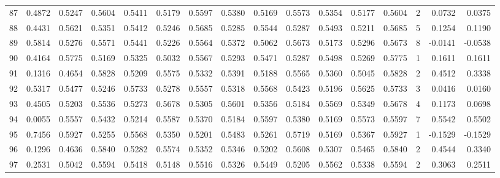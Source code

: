 \begin{tabular}{lrrrrrrrrrrrrrrr}
87  &      0.4872 &  0.5247 &  0.5604 &  0.5411 &  0.5179 &  0.5597 &  0.5380 &  0.5169 &  0.5573 &  0.5354 &   0.5177 &     0.5604 &      2 &                    0.0732 &                     0.0375 \\
88  &      0.4431 &  0.5621 &  0.5351 &  0.5412 &  0.5246 &  0.5685 &  0.5285 &  0.5544 &  0.5287 &  0.5493 &   0.5211 &     0.5685 &      5 &                    0.1254 &                     0.1190 \\
89  &      0.5814 &  0.5276 &  0.5571 &  0.5441 &  0.5226 &  0.5564 &  0.5372 &  0.5062 &  0.5673 &  0.5173 &   0.5296 &     0.5673 &      8 &                   -0.0141 &                    -0.0538 \\
90  &      0.4164 &  0.5775 &  0.5169 &  0.5325 &  0.5032 &  0.5567 &  0.5293 &  0.5471 &  0.5287 &  0.5498 &   0.5269 &     0.5775 &      1 &                    0.1611 &                     0.1611 \\
91  &      0.1316 &  0.4654 &  0.5828 &  0.5209 &  0.5575 &  0.5332 &  0.5391 &  0.5188 &  0.5565 &  0.5360 &   0.5045 &     0.5828 &      2 &                    0.4512 &                     0.3338 \\
92  &      0.5317 &  0.5477 &  0.5246 &  0.5733 &  0.5278 &  0.5557 &  0.5318 &  0.5568 &  0.5423 &  0.5196 &   0.5625 &     0.5733 &      3 &                    0.0416 &                     0.0160 \\
93  &      0.4505 &  0.5203 &  0.5536 &  0.5273 &  0.5678 &  0.5305 &  0.5601 &  0.5356 &  0.5184 &  0.5569 &   0.5349 &     0.5678 &      4 &                    0.1173 &                     0.0698 \\
94  &      0.0055 &  0.5557 &  0.5432 &  0.5214 &  0.5587 &  0.5370 &  0.5184 &  0.5597 &  0.5380 &  0.5169 &   0.5573 &     0.5597 &      7 &                    0.5542 &                     0.5502 \\
95  &      0.7456 &  0.5927 &  0.5255 &  0.5568 &  0.5350 &  0.5201 &  0.5483 &  0.5261 &  0.5719 &  0.5169 &   0.5367 &     0.5927 &      1 &                   -0.1529 &                    -0.1529 \\
96  &      0.1296 &  0.4636 &  0.5840 &  0.5282 &  0.5574 &  0.5352 &  0.5346 &  0.5202 &  0.5608 &  0.5307 &   0.5465 &     0.5840 &      2 &                    0.4544 &                     0.3340 \\
97  &      0.2531 &  0.5042 &  0.5594 &  0.5418 &  0.5148 &  0.5516 &  0.5326 &  0.5449 &  0.5205 &  0.5562 &   0.5338 &     0.5594 &      2 &                    0.3063 &                     0.2511 \\

\end{tabular}
